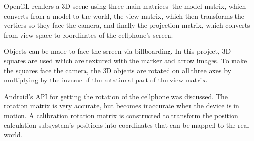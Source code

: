 OpenGL renders a 3D scene using three main matrices: the model matrix, which converts from a model to the world, the view matrix, which then transforms the vertices so they face the camera, and finally the projection matrix, which converts from view space to coordinates of the cellphone's screen.

Objects can be made to face the screen via billboarding. In this project, 3D squares are used which are textured with the marker and arrow images. To make the squares face the camera, the 3D objects are rotated on all three axes by multiplying by the inverse of the rotational part of the view matrix.

Android's API for getting the rotation of the cellphone was discussed. The rotation matrix is very accurate, but becomes inaccurate when the device is in motion. A calibration rotation matrix is constructed to transform the position calculation subsystem's positions into coordinates that can be mapped to the real world.
